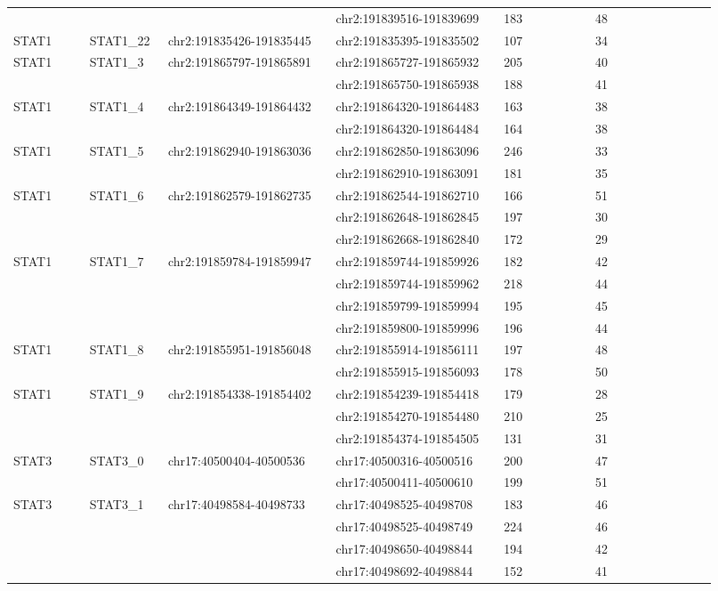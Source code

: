 \begin{landscape}
\begin{longtable}{p{0.1\linewidth}|p{0.1\linewidth}p{0.22\linewidth}p{0.22\linewidth}p{0.12\linewidth}p{0.16\linewidth}}
\\
 & & & chr2:191839516-191839699 & 183 & 48
\\
STAT1 & STAT1\_22 & chr2:191835426-191835445 & chr2:191835395-191835502 & 107 & 34
\\
STAT1 & STAT1\_3 & chr2:191865797-191865891 & chr2:191865727-191865932 & 205 & 40
\\
 & & & chr2:191865750-191865938 & 188 & 41
\\
STAT1 & STAT1\_4 & chr2:191864349-191864432 & chr2:191864320-191864483 & 163 & 38
\\
 & & & chr2:191864320-191864484 & 164 & 38
\\
STAT1 & STAT1\_5 & chr2:191862940-191863036 & chr2:191862850-191863096 & 246 & 33
\\
 & & & chr2:191862910-191863091 & 181 & 35
\\
STAT1 & STAT1\_6 & chr2:191862579-191862735 & chr2:191862544-191862710 & 166 & 51
\\
 & & & chr2:191862648-191862845 & 197 & 30
\\
 & & & chr2:191862668-191862840 & 172 & 29
\\
STAT1 & STAT1\_7 & chr2:191859784-191859947 & chr2:191859744-191859926 & 182 & 42
\\
 & & & chr2:191859744-191859962 & 218 & 44
\\
 & & & chr2:191859799-191859994 & 195 & 45
\\
 & & & chr2:191859800-191859996 & 196 & 44
\\
STAT1 & STAT1\_8 & chr2:191855951-191856048 & chr2:191855914-191856111 & 197 & 48
\\
 & & & chr2:191855915-191856093 & 178 & 50
\\
STAT1 & STAT1\_9 & chr2:191854338-191854402 & chr2:191854239-191854418 & 179 & 28
\\
 & & & chr2:191854270-191854480 & 210 & 25
\\
 & & & chr2:191854374-191854505 & 131 & 31
\\
\hline
STAT3 & STAT3\_0 & chr17:40500404-40500536 & chr17:40500316-40500516 & 200 & 47
\\
 & & & chr17:40500411-40500610 & 199 & 51
\\
STAT3 & STAT3\_1 & chr17:40498584-40498733 & chr17:40498525-40498708 & 183 & 46
\\
 & & & chr17:40498525-40498749 & 224 & 46
\\
 & & & chr17:40498650-40498844 & 194 & 42
\\
 & & & chr17:40498692-40498844 & 152 & 41

\end{longtable}
\end{landscape}
